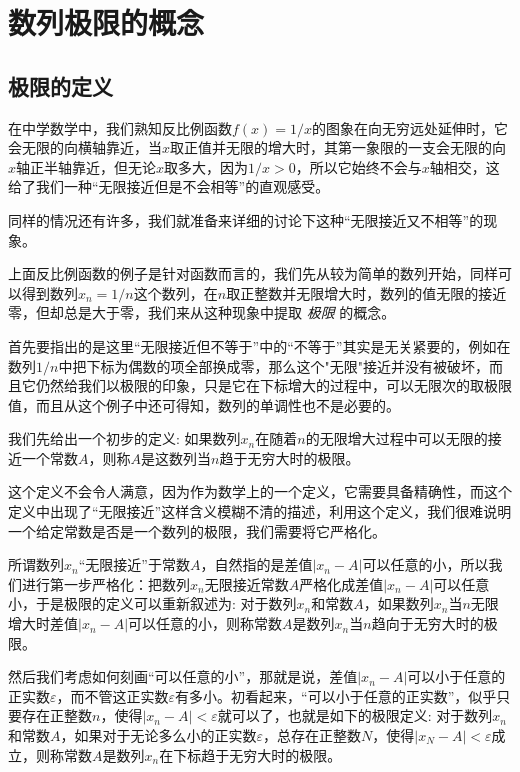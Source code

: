 
\section{数列极限的概念}
\label{sec:the-definition-of-sequence-limit}

\subsection{极限的定义}
\label{sec:definition-number-sequence-limit}

在中学数学中，我们熟知反比例函数$f(x)=1/x$的图象在向无穷远处延伸时，它会无限的向横轴靠近，当$x$取正值并无限的增大时，其第一象限的一支会无限的向$x$轴正半轴靠近，但无论$x$取多大，因为$1/x>0$，所以它始终不会与$x$轴相交，这给了我们一种“无限接近但是不会相等”的直观感受。

同样的情况还有许多，我们就准备来详细的讨论下这种“无限接近又不相等”的现象。

上面反比例函数的例子是针对函数而言的，我们先从较为简单的数列开始，同样可以得到数列$x_n=1/n$这个数列，在$n$取正整数并无限增大时，数列的值无限的接近零，但却总是大于零，我们来从这种现象中提取 \emph{极限} 的概念。

首先要指出的是这里“无限接近但不等于”中的“不等于”其实是无关紧要的，例如在数列$1/n$中把下标为偶数的项全部换成零，那么这个"无限"接近并没有被破坏，而且它仍然给我们以极限的印象，只是它在下标增大的过程中，可以无限次的取极限值，而且从这个例子中还可得知，数列的单调性也不是必要的。

我们先给出一个初步的定义: 如果数列$x_n$在随着$n$的无限增大过程中可以无限的接近一个常数$A$，则称$A$是这数列当$n$趋于无穷大时的极限。

这个定义不会令人满意，因为作为数学上的一个定义，它需要具备精确性，而这个定义中出现了“无限接近”这样含义模糊不清的描述，利用这个定义，我们很难说明一个给定常数是否是一个数列的极限，我们需要将它严格化。

所谓数列$x_n$“无限接近”于常数$A$，自然指的是差值$|x_n-A|$可以任意的小，所以我们进行第一步严格化：把数列$x_n$无限接近常数$A$严格化成差值$|x_n-A|$可以任意小，于是极限的定义可以重新叙述为: 对于数列$x_n$和常数$A$，如果数列$x_n$当$n$无限增大时差值$|x_n-A|$可以任意的小，则称常数$A$是数列$x_n$当$n$趋向于无穷大时的极限。

然后我们考虑如何刻画“可以任意的小”，那就是说，差值$|x_n-A|$可以小于任意的正实数$\varepsilon$，而不管这正实数$\varepsilon$有多小。初看起来，“可以小于任意的正实数”，似乎只要存在正整数$n$，使得$|x_n-A|<\varepsilon$就可以了，也就是如下的极限定义: 对于数列$x_n$和常数$A$，如果对于无论多么小的正实数$\varepsilon$，总存在正整数$N$，使得$|x_N-A|<\varepsilon$成立，则称常数$A$是数列$x_n$在下标趋于无穷大时的极限。

